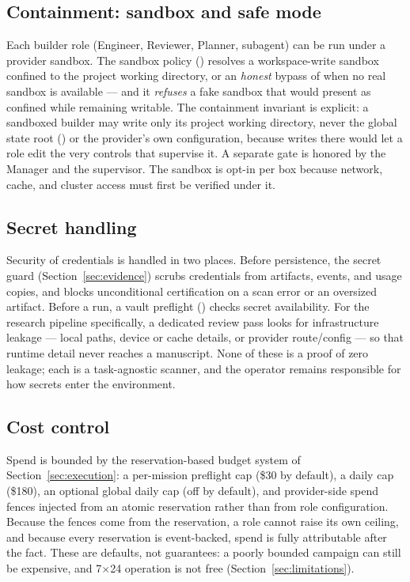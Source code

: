 \subsection{Containment: sandbox and safe mode}

Each builder role (Engineer, Reviewer, Planner, subagent) can be run under a
provider sandbox. The sandbox policy () resolves a
workspace-write sandbox confined to the project working directory, or an
\emph{honest} bypass of  when no real sandbox is available --- and it
\emph{refuses} a fake sandbox that would present as confined while remaining
writable. The containment invariant is explicit: a sandboxed builder may write only
its project working directory, never the global state root
() or the provider's own configuration, because
writes there would let a role edit the very controls that supervise it. A separate
 gate is honored by the Manager and the supervisor.
The sandbox is opt-in per box because network, cache, and cluster access must first
be verified under it.

\subsection{Secret handling}

Security of credentials is handled in two places. Before persistence, the secret
guard (Section~\ref{sec:evidence}) scrubs credentials from artifacts, events, and
usage copies, and blocks unconditional certification on a scan error or an
oversized artifact. Before a run, a vault preflight ()
checks secret availability. For the research pipeline specifically, a dedicated
review pass looks for infrastructure leakage --- local paths, device or cache
details, or provider route/config --- so that runtime detail never reaches a
manuscript. None of these is a proof of zero leakage; each is a task-agnostic
scanner, and the operator remains responsible for how secrets enter the
environment.

\subsection{Cost control}

Spend is bounded by the reservation-based budget system of
Section~\ref{sec:execution}: a per-mission preflight cap (\$30 by default), a daily
cap (\$180), an optional global daily cap (off by default), and provider-side spend
fences injected from an atomic reservation rather than from role configuration.
Because the fences come from the reservation, a role cannot raise its own ceiling,
and because every reservation is event-backed, spend is fully attributable after
the fact. These are defaults, not guarantees: a poorly bounded campaign can still be
expensive, and 7$\times$24 operation is not free (Section~\ref{sec:limitations}).
